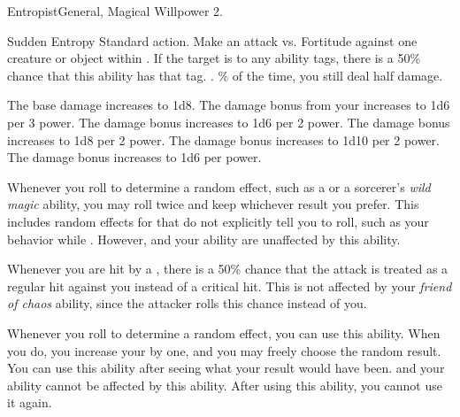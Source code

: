   \begin{magicalfeat}{Entropist}{General, Magical}
    \featpre Willpower 2.

    \begin{magicalactiveability}{Sudden Entropy}
      \abilityusagetime Standard action.
      \rankline
      Make an attack vs. Fortitude against one creature or object within \shortrange.
      If the target is \vulnerable to any ability tags, there is a 50\% chance that this ability has that tag.
      \hit \damageranktwo.
      \% of the time, you still deal half damage.

      \rankline
       The base damage increases to 1d8.
       The damage bonus from your  increases to 1d6 per 3 power.
       The damage bonus increases to 1d6 per 2 power.
       The damage bonus increases to 1d8 per 2 power.
       The damage bonus increases to 1d10 per 2 power.
       The damage bonus increases to 1d6 per power.
    \end{magicalactiveability}

     Whenever you roll to determine a random effect, such as a  or a sorcerer's \textit{wild magic} ability, you may roll twice and keep whichever result you prefer.
    This includes random effects for that do not explicitly tell you to roll, such as your behavior while \confused.
    However,  and your  ability are unaffected by this ability.

     Whenever you are hit by a , there is a 50\% chance that the attack is treated as a regular hit against you instead of a critical hit.
    This is not affected by your \textit{friend of chaos} ability, since the attacker rolls this chance instead of you.

     Whenever you roll to determine a random effect, you can use this ability.
    When you do, you increase your  by one, and you may freely choose the random result.
    You can use this ability after seeing what your result would have been.
     and your  ability cannot be affected by this ability.
    After using this ability, you  cannot use it again.
  \end{magicalfeat}

